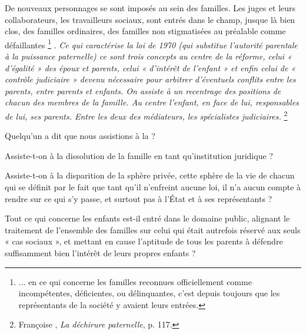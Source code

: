  De nouveaux personnages se sont imposés au sein des familles. Les juges et leurs collaborateurs, les travailleurs sociaux, sont entrés dans le champ, jusque là bien clos, des familles ordinaires, des familles non stigmatisées au préalable comme défaillantes%
\footnote{... en ce qui concerne les familles reconnues officiellement comme incompétentes, déficientes, ou délinquantes, c'est depuis toujours que les représentants de la société y avaient leurs entrées.}%
. {\emph{Ce qui caractérise la loi de 1970 (qui substitue l'autorité parentale à la puissance paternelle) ce sont trois concepts au centre de la réforme, celui « d'égalité » des époux et parents, celui « d'intérêt de l'enfant » et enfin celui de « contrôle judiciaire » devenu nécessaire pour arbitrer d'éventuels conflits entre les parents, entre parents et enfants. On assiste à un recentrage des positions de chacun des membres de la famille. Au centre l'enfant, en face de lui, responsables de lui, ses parents. Entre les deux des médiateurs, les spécialistes judiciaires.}%
\footnote{Françoise , \emph{La déchirure paternelle}, p. 117.}%
}

 Quelqu'un a dit que nous assistions à la  ? 

 Assiste-t-on à la dissolution de la famille en tant qu'institution juridique ? 

 Assiste-t-on à la disparition de la sphère privée, cette sphère de la vie de chacun qui se définit par le fait que tant qu'il n'enfreint aucune loi, il n'a aucun compte à rendre sur ce qui s'y passe, et surtout pas à l'État et à ses représentants ? 

 Tout ce qui concerne les enfants est-il entré dans le domaine public, alignant le traitement de l'ensemble des familles sur celui qui était autrefois réservé aux seuls « cas sociaux », et mettant en cause l'aptitude de tous les parents à défendre suffisamment bien l'intérêt de leurs propres enfants ?




